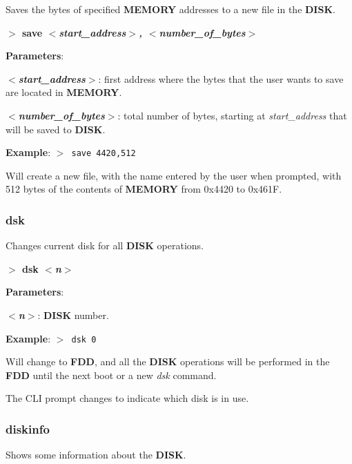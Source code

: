         Saves the bytes of specified \textbf{MEMORY} addresses to a new file in
        the \textbf{DISK}.

        \hspace{1.9cm}\textbf{$>$ save \textit{$<$start\_address$>$,
        $<$number\_of\_bytes$>$}}

        \textbf{Parameters}:

        \hspace{1cm}\textbf{\textit{$<$start\_address$>$}}: first address where
        the bytes that the user wants to save are located in \textbf{MEMORY}.

        \hspace{1cm}\textbf{\textit{$<$number\_of\_bytes$>$}}: total number of
        bytes, starting at \textit{start\_address} that will be saved to
        \textbf{DISK}.
        
        \textbf{Example}: \texttt{$>$ save 4420,512}

        Will create a new file, with the name entered by the user when prompted,
        with 512 bytes of the contents of \textbf{MEMORY} from 0x4420 to 0x461F.

        \subsubsection{{dsk}}
        \label{cmd:dsk}

        Changes current disk for all \textbf{DISK} operations.

        \hspace{1.9cm}\textbf{$>$ dsk \textit{$<$n$>$}}

        \textbf{Parameters}:

        \hspace{1cm}\textbf{\textit{$<$n$>$}}: \textbf{DISK} number.

        \textbf{Example}: \texttt{$>$ dsk 0}

        Will change to \textbf{FDD}, and all the \textbf{DISK} operations will
        be performed in the \textbf{FDD} until the next boot or a new \textit{dsk}
        command.

        The CLI prompt changes to indicate which disk is in use.

        \subsubsection{{diskinfo}}
        Shows some information about the \textbf{DISK}.


